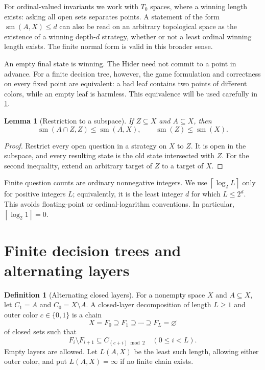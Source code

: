 \documentclass[11pt,letterpaper]{article}
\numberwithin{equation}{section}
\newtheorem{lemma}[lemma]{Lemma}
\theoremstyle{definition}
\newtheorem{definition}[definition]{Definition}
\theoremstyle{remark}
\theoremstyle{definition}
\newcommand{\sm}{\operatorname{sm}}
\newcommand{\ceil}[1]{\left\lceil#1\right\rceil}
\begin{document}
For ordinal-valued invariants we work with $T_0$ spaces, where a winning
length exists: asking all open sets separates points. A statement of the form
$\sm(A,X)\leq d$ can also be read on an arbitrary topological space as the
existence of a winning depth-$d$ strategy, whether or not a least ordinal
winning length exists. The finite normal form is valid in this broader sense.

An empty final state is winning. The Hider need not commit to a point in advance.
For a finite decision tree, however, the game formulation and correctness on
every fixed point are equivalent: a bad leaf contains two points of different
colors, while an empty leaf is harmless. This equivalence will be used carefully
in \cref{sec:normal}.

\begin{lemma}[Restriction to a subspace]\label{lem:subspace}
If $Z\subseteq X$ and $A\subseteq X$, then
\[
 \sm(A\cap Z,Z)\leq\sm(A,X),\qquad \sm(Z)\leq\sm(X).
\]
\end{lemma}
\begin{proof}
Restrict every open question in a strategy on $X$ to $Z$. It is open in the
subspace, and every resulting state is the old state intersected with $Z$.
For the second inequality, extend an arbitrary target of $Z$ to a target of $X$.
\end{proof}

Finite question counts are ordinary nonnegative integers. We use
$\ceil{\log_2 L}$ only for positive integers $L$; equivalently, it is the least
integer $d$ for which $L\leq2^d$. This avoids floating-point or ordinal-logarithm
conventions. In particular, $\ceil{\log_2 1}=0$.

\section{Finite decision trees and alternating layers}\label{sec:normal}

\begin{definition}[Alternating closed layers]
For a nonempty space $X$ and $A\subseteq X$, let $C_1=A$ and
$C_0=X\setminus A$. A closed-layer decomposition of length $L\geq1$ and
outer color $c\in\{0,1\}$ is a chain
\begin{equation}\label{eq:layerchain}
 X=F_0\supseteq F_1\supseteq\cdots\supseteq F_L=\varnothing
\end{equation}
of closed sets such that
\begin{equation}\label{eq:layercolor}
 F_i\setminus F_{i+1}\subseteq C_{(c+i)\bmod2}
 \quad(0\leq i<L).
\end{equation}
Empty layers are allowed. Let $L(A,X)$ be the least such length, allowing either
outer color, and put $L(A,X)=\infty$ if no finite chain exists.
\end{definition}
\end{document}
